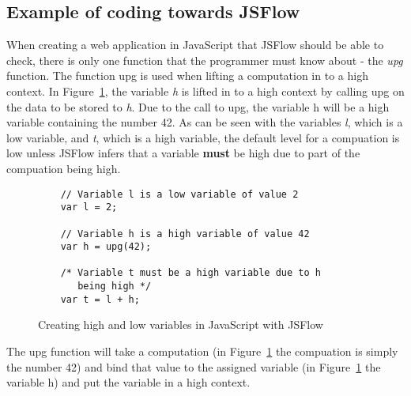 \subsection{Example of coding towards JSFlow}
When creating a web application in JavaScript that JSFlow should be able to check, there is only one function that the programmer must know about - the \emph{upg} function. The function upg is used when lifting a computation in to a high context. In Figure~\ref{fig:upg}, the variable \emph{h} is lifted in to a high context by calling upg on the data to be stored to \emph{h}. Due to the call to upg, the variable h will be a high variable containing the number 42. As can be seen with the variables \emph{l}, which is a low variable, and \emph{t}, which is a high variable, the default level for a compuation is low unless JSFlow infers that a variable \textbf{must} be high due to part of the compuation being high.

\begin{figure}[h]
  \begin{lstlisting}
    // Variable l is a low variable of value 2
    var l = 2;

    // Variable h is a high variable of value 42
    var h = upg(42);

    /* Variable t must be a high variable due to h
       being high */
    var t = l + h;
  \end{lstlisting}
  \caption{Creating high and low variables in JavaScript with JSFlow}
  \label{fig:upg}
\end{figure}
The upg function will take a computation (in Figure~\ref{fig:upg} the compuation is simply the number 42) and bind that value to the assigned variable (in Figure~\ref{fig:upg} the variable h) and put the variable in a high context.

